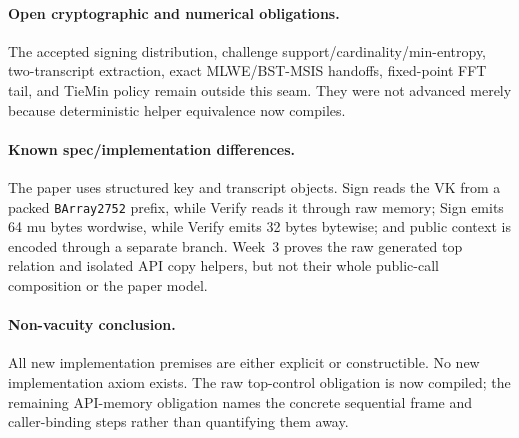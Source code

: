 \paragraph{Open cryptographic and numerical obligations.}
The accepted signing distribution, challenge support/cardinality/min-entropy,
two-transcript extraction, exact MLWE/BST-MSIS handoffs, fixed-point FFT tail,
and TieMin policy remain outside this seam. They were not advanced merely
because deterministic helper equivalence now compiles.

\paragraph{Known spec/implementation differences.}
The paper uses structured key and transcript objects. Sign reads the VK from
a packed \texttt{BArray2752} prefix, while Verify reads it through raw memory;
Sign emits 64 mu bytes wordwise, while Verify emits 32 bytes bytewise; and
public context is encoded through a separate branch. Week~3 proves the raw
generated top relation and isolated API copy helpers, but not their whole
public-call composition or the paper model.

\paragraph{Non-vacuity conclusion.}
All new implementation premises are either explicit or constructible. No new
implementation axiom exists. The raw top-control obligation is now compiled;
the remaining API-memory obligation names the concrete sequential frame and
caller-binding steps rather than quantifying them away.
